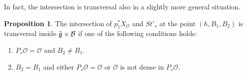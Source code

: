 \documentclass[12pt]{article}
\newcommand{\B}{\mathcal{B}}
\newcommand{\s}{\mathcal{O}}
\theoremstyle{plain}
\theoremstyle{definition}
\newtheorem{prop}[theorem]{Proposition}
\begin{document}
In fact, the intersection is transversal also in a slightly more general situation. 

\begin{prop}\label{transversal_claim with extra steps} 
    The intersection of $p_{1}^*\mathring{X}_{\mathcal{O}}$ and $St'_{s}$ at the point $(h,B_1,B_2)$ is transversal inside $\Tilde{\mathfrak{g}}\times \B$ if one of the following conditions holds: 
    \begin{enumerate}
        \item $P_s\s=\s$ and $B_2\neq B_1$.
        \item $B_2=B_1$ and either $P_s\s=\s$ or $\mathcal{O}$ is not dense in $P_{s} \mathcal{O}$.
    \end{enumerate}
    
\end{prop}
\end{document}
